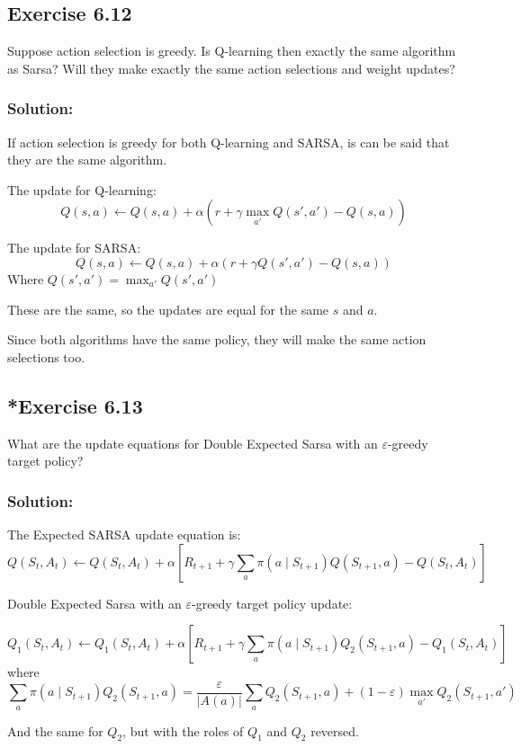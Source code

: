 \subsection*{Exercise 6.12}
Suppose action selection is greedy. Is Q-learning then exactly the same
algorithm as Sarsa? Will they make exactly the same action selections and weight
updates?

\subsubsection*{Solution:}
If action selection is greedy for both Q-learning and SARSA, is can be said that they are the same algorithm. 

The update for Q-learning:
\[
Q(s, a) \leftarrow Q(s, a) + \alpha \left( r + \gamma \max_{a'} Q(s', a') - Q(s, a) \right)
\]

The update for SARSA:
\[
Q(s, a) \leftarrow Q(s, a) + \alpha \left( r + \gamma Q(s', a') - Q(s, a) \right)
\]
Where $Q(s', a') = \max_{a'} Q(s', a')$

These are the same, so the updates are equal for the same $s$ and $a$.

Since both algorithms have the same policy, they will make the same action selections too.


\subsection*{*Exercise 6.13}
What are the update equations for Double Expected Sarsa with an
$\varepsilon$-greedy target policy?

\subsubsection*{Solution:}
The Expected SARSA update equation is:
\[
    Q(S_t, A_t) \leftarrow Q(S_t, A_t) + \alpha \left[ R_{t+1} + \gamma \sum_{a} \pi(a \mid S_{t+1}) Q(S_{t+1}, a) - Q(S_t, A_t) \right]
\]

Double Expected Sarsa with an
$\varepsilon$-greedy target policy update:

\[
    Q_1(S_t, A_t) \leftarrow Q_1(S_t, A_t) + \alpha \left[ R_{t+1} + \gamma \sum_{a} \pi(a \mid S_{t+1}) Q_2(S_{t+1}, a) - Q_1(S_t, A_t) \right]
\]
where
\[
    \sum_{a} \pi(a \mid S_{t+1}) Q_2(S_{t+1}, a) = \frac{\varepsilon}{|A(a)|} \sum_{a} Q_2(S_{t+1}, a) + (1- \varepsilon) \max_{a'} Q_2(S_{t+1}, a')
\]

And the same for $Q_2$, but with the roles of $Q_1$ and $Q_2$ reversed.


